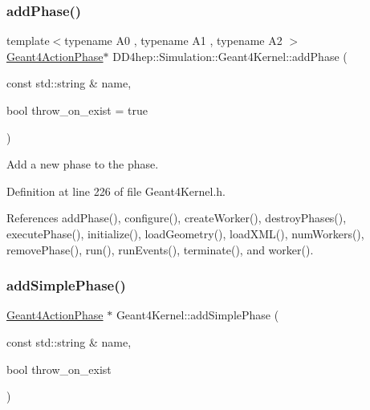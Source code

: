 \subsubsection{\texorpdfstring{add\+Phase()}{addPhase()}\hspace{0.1cm}{\footnotesize\ttfamily [4/4]}}
{\footnotesize\ttfamily template$<$typename A0 , typename A1 , typename A2 $>$ \\
\hyperlink{class_d_d4hep_1_1_simulation_1_1_geant4_action_phase}{Geant4\+Action\+Phase}$\ast$ D\+D4hep\+::\+Simulation\+::\+Geant4\+Kernel\+::add\+Phase (\begin{DoxyParamCaption}\item[{const std\+::string \&}]{name,  }\item[{bool}]{throw\+\_\+on\+\_\+exist = {\ttfamily true} }\end{DoxyParamCaption})\hspace{0.3cm}{\ttfamily [inline]}}



Add a new phase to the phase. 



Definition at line 226 of file Geant4\+Kernel.\+h.



References add\+Phase(), configure(), create\+Worker(), destroy\+Phases(), execute\+Phase(), initialize(), load\+Geometry(), load\+X\+M\+L(), num\+Workers(), remove\+Phase(), run(), run\+Events(), terminate(), and worker().

\hypertarget{class_d_d4hep_1_1_simulation_1_1_geant4_kernel_ad6e24016ebe31a06417ffac7f6e93818}{}\label{class_d_d4hep_1_1_simulation_1_1_geant4_kernel_ad6e24016ebe31a06417ffac7f6e93818} 
\subsubsection{\texorpdfstring{add\+Simple\+Phase()}{addSimplePhase()}}
{\footnotesize\ttfamily \hyperlink{class_d_d4hep_1_1_simulation_1_1_geant4_action_phase}{Geant4\+Action\+Phase} $\ast$ Geant4\+Kernel\+::add\+Simple\+Phase (\begin{DoxyParamCaption}\item[{const std\+::string \&}]{name,  }\item[{bool}]{throw\+\_\+on\+\_\+exist }\end{DoxyParamCaption})\hspace{0.3cm}{\ttfamily [virtual]}}



